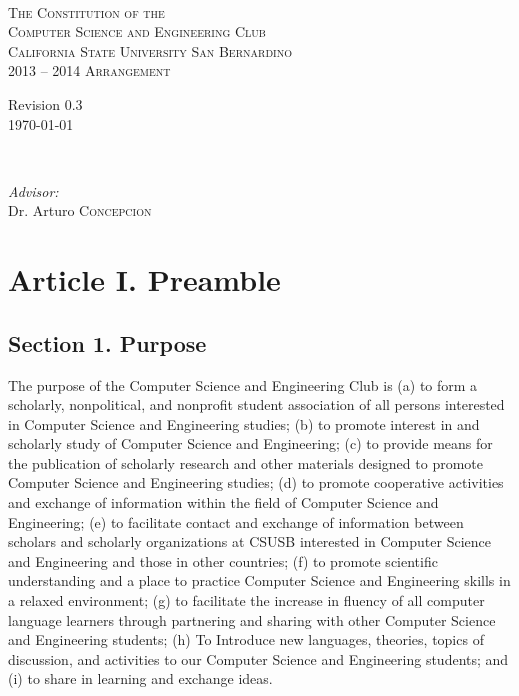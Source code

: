 \documentclass{article}
\begin{document}
\begin{titlepage}
\begin{center}

~ \\[2cm]
\textsc{\LARGE The Constitution of the}\\[0.5cm]
\textsc{\LARGE Computer Science and Engineering Club}\\[1.0cm]
\textsc{\large California State University San Bernardino}\\[5cm]
\textsc{\Large 2013 -- 2014 Arrangement}\\[10cm]

\begin{minipage}{0.4\textwidth}
\begin{flushleft} \large
Revision 0.3 \\
\today
\end{flushleft}
\end{minipage}
~
\begin{minipage}{0.55\textwidth}
\begin{flushright} \large
\emph{Advisor:} \\
Dr. Arturo \textsc{Concepcion}\\
\end{flushright}
\end{minipage}
\end{center}
\end{titlepage}

\newpage
\tableofcontents

\newpage
\section{Article I. Preamble}

  \subsection{Section 1. Purpose}
    The purpose of the Computer Science and Engineering Club  is (a) to form a scholarly, nonpolitical, and nonprofit student association of all persons interested in Computer Science and Engineering studies; (b) to promote interest in and scholarly study of Computer Science and Engineering; (c) to provide means for the publication of scholarly research and other materials designed to promote Computer Science and Engineering studies; (d) to promote cooperative activities and exchange of information within the field of Computer Science and Engineering; (e) to facilitate contact and exchange of information between scholars and scholarly organizations at CSUSB interested in Computer Science and Engineering and those in other countries; (f) to promote scientific understanding and a place to practice Computer Science and Engineering skills in a relaxed environment; (g) to facilitate the increase in fluency of all computer language learners through partnering and sharing with other Computer Science and Engineering students; (h) To Introduce new languages, theories, topics of discussion,  and activities to our Computer Science and Engineering students; and (i) to share in learning and exchange ideas.
\end{document}
